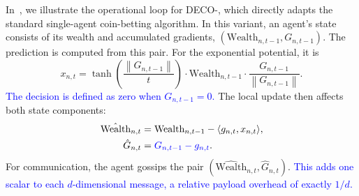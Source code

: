 \documentclass[journal]{IEEEtran}
\newcommand{\w}{\text{Wealth}}
\newcommand{\br}[1]{\left(#1\right)}
\newcommand{\norm}[1]{\left\lVert{#1}\right\rVert}
\newcommand{\algname}{{DECO}\xspace}
\begin{document}
In~, we illustrate the operational loop for \algname{}-, which directly adapts the standard single-agent coin-betting algorithm.
In this variant, an agent's state consists of its wealth and accumulated gradients, $(\w_{n,t-1}, G_{n,t-1})$.
The prediction is computed from this pair.
For the exponential potential, it is
\begin{equation}
    x_{n,t} = \tanh\br{\frac{\norm{G_{n,t-1}}}{t}} \cdot \w_{n,t-1} \cdot \frac{G_{n,t-1}}{\norm{G_{n,t-1}}}.\label{eq:deco1_bet_vec}
\end{equation}
\textcolor{blue}{The decision is defined as zero when $G_{n,t-1}=0$.}
The local update then affects both state components:
\begin{align}
    \hat{\w}_{n,t} & = \w_{n,t-1} - \langle g_{n,t}, x_{n,t} \rangle,\label{eq:local-update-wealth} \\
    \hat{G}_{n,t}  & = \textcolor{blue}{G_{n,t-1} - g_{n,t}}.\label{eq:local-update-G}
\end{align}
For communication, the agent gossips the pair $(\hat{\w}_{n,t}, \hat{G}_{n,t})$.
\textcolor{blue}{This adds one scalar to each $d$-dimensional message, a relative payload overhead of exactly $1/d$.}
\end{document}
